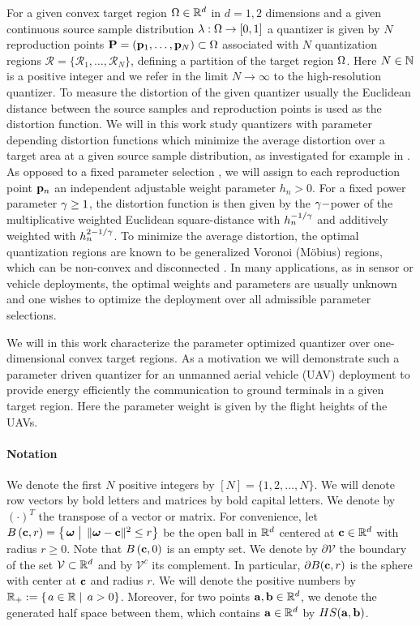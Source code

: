 \documentclass[smallabstract,smallcaptions]{dccpaper}
\newcounter{example}[section]
\newcommand{\Ball}{\ensuremath{B}}          %
\newcommand{\Vor}{\ensuremath{\mathcal{V}}}         %
\newcommand{\Rset}{\ensuremath{\mathcal R}}
\newcommand{\philippstart}{\color{black}}
\newcommand{\philippend}{\color{black}}
\begin{document}
%
For a given convex target region $\Omega\in{\ensuremath{\mathbb R}}^d$ in $d=1,2$ dimensions and a given continuous source sample distribution
$\lambda:\Omega\to [0,1]$ a quantizer is given by $N$ reproduction points $\mathbf P =({\mathbf p}_1,\dots,{\mathbf p}_N)\subset \Omega$ associated
with $N$ quantization regions $\Rset=\{\Rset_1,\dots,\Rset_N\}$, defining a partition of the target region $\Omega$. Here
$N\in{\ensuremath{\mathbb N}}$ is a positive integer and we refer in the limit $N\to\infty$ to the high-resolution quantizer.  To measure the
distortion of the given quantizer usually the Euclidean distance between the source samples and reproduction points is
used as the distortion function. We will in this work study  quantizers with parameter depending distortion functions
which minimize the average distortion over a target area at a given source sample distribution, as investigated for
example in \cite{KJ16b,KJ17}.
%
As opposed to a fixed parameter selection \cite{KSS18}, we will assign to each reproduction point ${\mathbf p}_n$ an independent
adjustable weight parameter $h_n>0$. For a fixed power parameter $\gamma\geq1$, the distortion function is then given by
the $\gamma-$power of the  multiplicative weighted Euclidean square-distance with $h_n^{-1/\gamma}$ and additively weighted
with $h_n^{2-1/\gamma}$. To minimize the average distortion, the optimal quantization regions are known to be generalized
Voronoi (Möbius) regions, which can be non-convex and disconnected \cite{BWY07}. In many applications, as in sensor or
vehicle deployments, the optimal weights and parameters are usually unknown and one wishes to optimize the deployment
over all admissible parameter selections.

We will in this work characterize the parameter optimized quantizer  over one-dimensional convex target
regions. As a motivation we will demonstrate such a parameter driven quantizer for an unmanned aerial vehicle (UAV) deployment
to provide energy efficiently the communication to ground terminals in a given target region. 
Here the parameter weight is given by the flight heights of the UAVs.  

\philippstart \paragraph{Notation} We denote the first
$N$ positive integers by $[N]=\{1,2,\dots,N\}$. We will denote row vectors by bold letters and
matrices by bold capital letters. We denote by $(\cdot)^T$ the transpose of a vector or matrix.
For convenience, let $\Ball\left(\vc,r\right)=\set{\vome}{\|\vome-\vc\|^2\le r}$ be the open ball in ${\mathbb R}^d$ centered at
${\mathbf c}\in{\ensuremath{\mathbb R}}^d$ with radius $r\geq 0$. Note that $\Ball\left(\vc,0\right)$ is an empty set. We denote by $\partial \Vor$ the
boundary of the set $\Vor\subset\R^d$ and by $\Vor^c$ its complement. In particular, $\partial \Ball(\vc,r)$ is the sphere
with center at ${\mathbf c}$ and radius $r$. We will denote the positive numbers by $\R_+:=\set{a\in\R}{a>0}$.
Moreover, for two points ${\mathbf a},{\mathbf b}\in{\ensuremath{\mathbb R}}^d$, we denote the generated half space between them, which contains ${\mathbf a}\in{\ensuremath{\mathbb R}}^d$
by $HS({\mathbf a}, {\mathbf b})$.  \philippend
\end{document}

